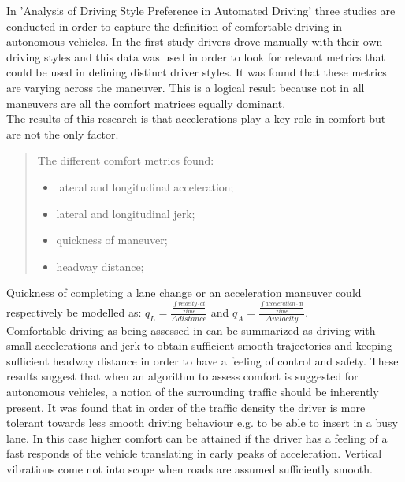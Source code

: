 In 'Analysis of Driving Style Preference in Automated Driving' \cite{Bellem} three studies are conducted in order to capture the definition of comfortable driving in autonomous vehicles.
In the first study drivers drove manually with their own driving styles and this data was used in order to look for relevant metrics that could be used in defining distinct driver styles. It was found that these metrics are varying across the maneuver. This is a logical result because not in all maneuvers are all the comfort matrices equally dominant.\\
The results of this research is that accelerations play a key role in comfort but are not the only factor. \cite{Bellem}\\

\begin{quote}
	The different comfort metrics found:
	\begin{itemize}
		\item lateral and longitudinal acceleration;
		\item lateral and longitudinal jerk;
		\item quickness of maneuver;
		\item headway distance;
	\end{itemize}
\end{quote}

Quickness of completing a lane change or an acceleration maneuver could respectively be modelled as: $q_L = \frac{\frac{\int velocity\cdot dt}{Time}}{\Delta distance}$ and $q_A = \frac{\frac{\int acceleration\cdot dt}{Time}}{\Delta velocity}$.\\

Comfortable driving as being assessed in \cite{Bellem} can be summarized as driving with small accelerations and jerk to obtain sufficient smooth trajectories and keeping sufficient headway distance in order to have a feeling of control and safety. These results suggest that when an algorithm to assess comfort is suggested for autonomous vehicles, a notion of the surrounding traffic should be inherently present. It was found that in order of the traffic density the driver is more tolerant towards less smooth driving behaviour e.g. to be able to insert in a busy lane. In this case higher comfort can be attained if the driver has a feeling of a fast responds of the vehicle translating in early peaks of acceleration. Vertical vibrations come not into scope when roads are assumed sufficiently smooth.\\

